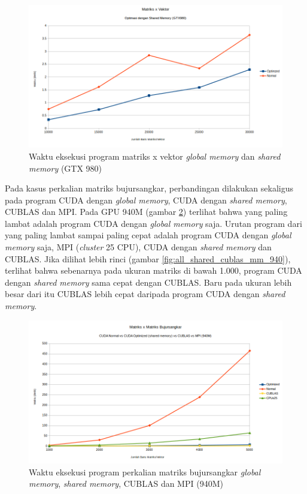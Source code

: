 \begin{figure}
	\centering
	\includegraphics[width=1\textwidth]
	{pics/shared_cuda_mv_980}
	\caption{Waktu eksekusi program matriks x vektor \textit{global memory} dan \textit{shared memory} (GTX 980)}
	\label{fig:shared_cuda_mv_980}
\end{figure}  

Pada kasus perkalian matriks bujursangkar, perbandingan dilakukan sekaligus pada program CUDA dengan \textit{global memory}, CUDA dengan \textit{shared memory}, CUBLAS dan MPI. Pada GPU 940M (gambar \ref{fig:all_mm_940}) terlihat bahwa yang paling lambat adalah program CUDA dengan \textit{global memory} saja. Urutan program dari yang paling lambat sampai paling cepat adalah program CUDA dengan \textit{global memory} saja, MPI (\textit{cluster} 25 CPU), CUDA dengan \textit{shared memory} dan CUBLAS. Jika dilihat lebih rinci (gambar \ref{fig:all_shared_cublas_mm_940}), terlihat bahwa sebenarnya pada ukuran matriks di bawah 1.000, program CUDA dengan \textit{shared memory} sama cepat dengan CUBLAS. Baru pada ukuran lebih besar dari itu CUBLAS lebih cepat daripada program CUDA dengan \textit{shared memory}.

\begin{figure}
	\centering
	\includegraphics[width=1\textwidth]
	{pics/all_mm_940}
	\caption{Waktu eksekusi program perkalian matriks bujursangkar \textit{global memory}, \textit{shared memory}, CUBLAS dan MPI (940M)}
	\label{fig:all_mm_940}
\end{figure} 

